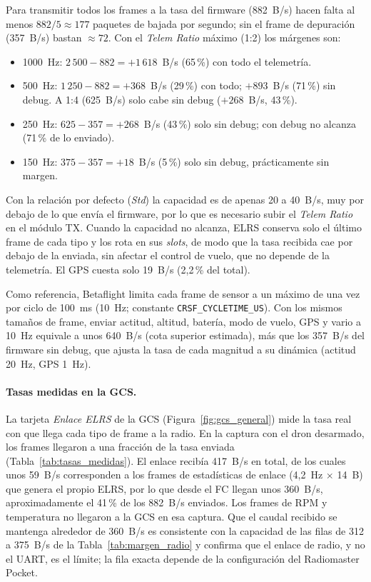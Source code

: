 \documentclass[12pt, letterpaper]{report}
\begin{document}
Para transmitir todos los frames a la tasa del firmware (882~B/s) hacen falta al menos $882/5 \approx 177$ paquetes de bajada por segundo; sin el frame de depuración (357~B/s) bastan $\approx 72$. Con el \textit{Telem Ratio} máximo (1:2) los márgenes son:
\begin{itemize}
    \item 1000~Hz: $2\,500-882 = +1\,618$~B/s (65\,\%) con todo el telemetría.
    \item 500~Hz: $1\,250-882 = +368$~B/s (29\,\%) con todo; $+893$~B/s (71\,\%) sin debug. A 1:4 (625~B/s) solo cabe sin debug ($+268$~B/s, 43\,\%).
    \item 250~Hz: $625-357 = +268$~B/s (43\,\%) solo sin debug; con debug no alcanza (71\,\% de lo enviado).
    \item 150~Hz: $375-357 = +18$~B/s (5\,\%) solo sin debug, prácticamente sin margen.
\end{itemize}
Con la relación por defecto (\textit{Std}) la capacidad es de apenas 20 a 40~B/s, muy por debajo de lo que envía el firmware, por lo que es necesario subir el \textit{Telem Ratio} en el módulo TX. Cuando la capacidad no alcanza, ELRS conserva solo el último frame de cada tipo y los rota en sus \textit{slots}, de modo que la tasa recibida cae por debajo de la enviada, sin afectar el control de vuelo, que no depende de la telemetría. El GPS cuesta solo 19~B/s (2,2\,\% del total).

Como referencia, Betaflight limita cada frame de sensor a un máximo de una vez por ciclo de 100~ms (10~Hz; constante \texttt{CRSF\_CYCLETIME\_US}). Con los mismos tamaños de frame, enviar actitud, altitud, batería, modo de vuelo, GPS y vario a 10~Hz equivale a unos 640~B/s (cota superior estimada), más que los 357~B/s del firmware sin debug, que ajusta la tasa de cada magnitud a su dinámica (actitud 20~Hz, GPS 1~Hz).

\paragraph{Tasas medidas en la GCS.} La tarjeta \textit{Enlace ELRS} de la GCS (Figura~\ref{fig:gcs_general}) mide la tasa real con que llega cada tipo de frame a la radio. En la captura con el dron desarmado, los frames llegaron a una fracción de la tasa enviada (Tabla~\ref{tab:tasas_medidas}). El enlace recibía 417~B/s en total, de los cuales unos 59~B/s corresponden a los frames de estadísticas de enlace (4,2~Hz $\times$ 14~B) que genera el propio ELRS, por lo que desde el FC llegan unos 360~B/s, aproximadamente el 41\,\% de los 882~B/s enviados. Los frames de RPM y temperatura no llegaron a la GCS en esa captura. Que el caudal recibido se mantenga alrededor de 360~B/s es consistente con la capacidad de las filas de 312 a 375~B/s de la Tabla~\ref{tab:margen_radio} y confirma que el enlace de radio, y no el UART, es el límite; la fila exacta depende de la configuración del Radiomaster Pocket.
\end{document}
